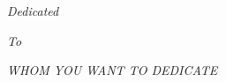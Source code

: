 \thispagestyle{empty}
\setcounter{page}{0}
\vspace*{4cm}
\centerline{\it{\large Dedicated}}%
\centerline{\it{ \large To}}
\centerline{\it{ \large WHOM YOU WANT TO DEDICATE}}
\clearpage
\thispagestyle{empty}
~\clearpage
{}


